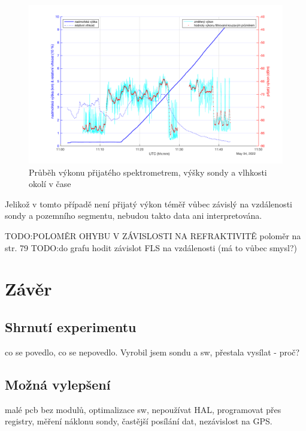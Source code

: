 \documentclass[twoside]{ctuthesis}
\theoremstyle{plain}
\theoremstyle{definition}
\theoremstyle{note}
\begin{document}
	\begin{figure}[hbtp]
		\centering
		\includegraphics[width=.9\textwidth]{Graphs/alt_hum_p_p_filt.pdf}
		\caption{Průběh výkonu přijatého spektrometrem, výšky sondy a vlhkosti okolí v čase}
		\label{grah:p:alt:hum}
	\end{figure}

	Jelikož v tomto případě není přijatý výkon téměř vůbec závislý na vzdálenosti sondy a pozemního segmentu, nebudou takto data ani interpretována. 

	TODO:POLOMĚR OHYBU V ZÁVISLOSTI NA REFRAKTIVITĚ poloměr na str. 79
	TODO:do grafu hodit závislot FLS na vzdálenosti (má to vůbec smysl?)

















	


\chapter{Závěr}
	\section{Shrnutí experimentu}
	co se povedlo, co se nepovedlo. Vyrobil jsem sondu a sw, přestala vysílat - proč? 

	\section{Možná vylepšení}
	malé pcb bez modulů, optimalizace sw, nepoužívat HAL, programovat přes registry, měření náklonu sondy, častější posílání dat, nezávislost na GPS.
\end{document}
